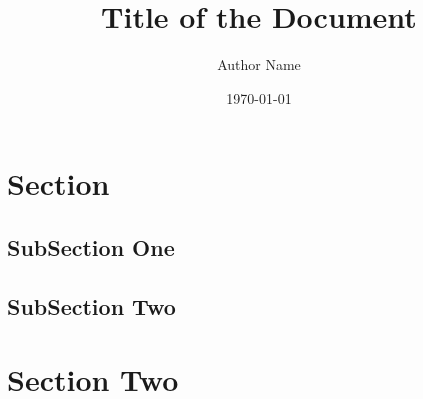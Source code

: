 \documentclass[12pt, twoside]{article}
\title{\vspace{-2cm}Title of the Document\vspace{-5mm}}
\author{Author Name\vspace{-5mm}}
\date{\today}
\begin{document}
\thispagestyle{firststyle}

\maketitle\thispagestyle{fancy}

\section{Section}

\subsection{SubSection One}

\lipsum[2-4]

\subsection{SubSection Two}

\lipsum[3-5]

\section{Section Two}

\lipsum[1-5]
\end{document}
